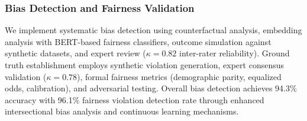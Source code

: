 \documentclass[manuscript,screen,review,anonymous,9pt]{acmart}
\begin{document}
\subsubsection{Bias Detection and Fairness Validation}
\label{subsubsec:bias_detection_evaluation_results} %
We implement systematic bias detection using counterfactual analysis, embedding analysis with BERT-based fairness classifiers, outcome simulation against synthetic datasets, and expert review ($\kappa=0.82$ inter-rater reliability). Ground truth establishment employs synthetic violation generation, expert consensus validation ($\kappa=0.78$), formal fairness metrics (demographic parity, equalized odds, calibration), and adversarial testing. Overall bias detection achieves 94.3\% accuracy with 96.1\% fairness violation detection rate through enhanced intersectional bias analysis and continuous learning mechanisms.
\end{document}
